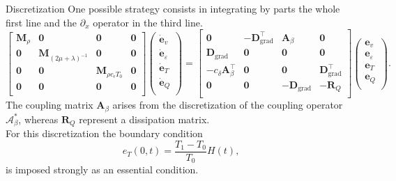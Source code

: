 \documentclass[aspectratio=169]{ISAE-Beamer}
\DeclareMathOperator*{\grad}{grad}
\begin{document}
\begin{frame}{Discretization}
One possible strategy consists in integrating by parts the whole first line and the $\partial_x$ operator in the third line.
\begin{equation*}
\begin{bmatrix}
\mathbf{M}_{\rho} & \mathbf{0} & \mathbf{0} & \mathbf{0}\\
\mathbf{0} & \mathbf{M}_{(2\mu + \lambda)^{-1}} & \mathbf{0} & \mathbf{0} \\
\mathbf{0} & \mathbf{0} & \mathbf{M}_{\rho c_\epsilon T_0} & \mathbf{0} \\
\mathbf{0} & \mathbf{0} & \mathbf{0} & \mathbf{0} \\
\end{bmatrix}
\begin{pmatrix}
\dot{\mathbf{e}}_v\\
\dot{\mathbf{e}}_\varepsilon\\
\dot{\mathbf{e}}_T\\
\dot{\mathbf{e}}_Q\\
\end{pmatrix}
= \begin{bmatrix}
\mathbf{0} & -\mathbf{D}_{\grad}^\top & \mathbf{A}_{\beta} & \mathbf{0}\\
\mathbf{D}_{\grad} & \mathbf{0} & \mathbf{0} & \mathbf{0} \\
-c_\delta \mathbf{A}_{\beta}^\top & \mathbf{0} &  \mathbf{0} & \mathbf{D}_{\grad}^\top \\
\mathbf{0} & \mathbf{0} & -\mathbf{D}_{\grad} & -\mathbf{R}_Q \\
\end{bmatrix}
\begin{pmatrix}
{\mathbf{e}}_v\\
{\mathbf{e}}_\varepsilon\\
{\mathbf{e}}_T\\
{\mathbf{e}}_Q\\
\end{pmatrix}.
\end{equation*}
The coupling matrix $\mathbf{A}_{\beta}$ arises from the discretization of the coupling operator $\mathcal{A}_\beta^*$, whereas $\mathbf{R}_Q$ represent a dissipation matrix. \\
For this discretization the boundary condition 
\begin{equation*}
e_T(0, t) = \frac{T_1 - T_0}{T_0} H(t), 
\end{equation*}
is imposed strongly as an essential condition.
\end{frame}
\end{document}
